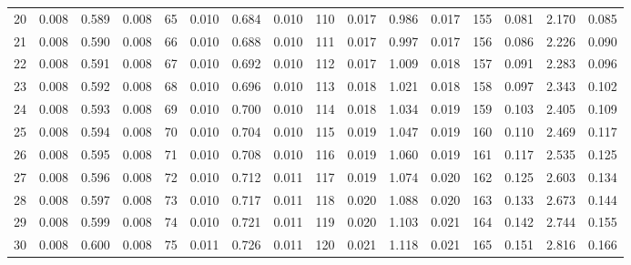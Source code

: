 \begin{table}[!h]
{\begin{tabular}{rrrr|rrrr|rrrr|crrr}
 20 & \tiny{  0.008} &   0.589 & \tiny{  0.008} &  65 & \tiny{  0.010} &   0.684 & \tiny{  0.010} & 110 & \tiny{  0.017} &   0.986 & \tiny{  0.017} & 155 & \tiny{  0.081} &   2.170 & \tiny{  0.085}\\
 21 & \tiny{  0.008} &   0.590 & \tiny{  0.008} &  66 & \tiny{  0.010} &   0.688 & \tiny{  0.010} & 111 & \tiny{  0.017} &   0.997 & \tiny{  0.017} & 156 & \tiny{  0.086} &   2.226 & \tiny{  0.090}\\
 22 & \tiny{  0.008} &   0.591 & \tiny{  0.008} &  67 & \tiny{  0.010} &   0.692 & \tiny{  0.010} & 112 & \tiny{  0.017} &   1.009 & \tiny{  0.018} & 157 & \tiny{  0.091} &   2.283 & \tiny{  0.096}\\
 23 & \tiny{  0.008} &   0.592 & \tiny{  0.008} &  68 & \tiny{  0.010} &   0.696 & \tiny{  0.010} & 113 & \tiny{  0.018} &   1.021 & \tiny{  0.018} & 158 & \tiny{  0.097} &   2.343 & \tiny{  0.102}\\
 24 & \tiny{  0.008} &   0.593 & \tiny{  0.008} &  69 & \tiny{  0.010} &   0.700 & \tiny{  0.010} & 114 & \tiny{  0.018} &   1.034 & \tiny{  0.019} & 159 & \tiny{  0.103} &   2.405 & \tiny{  0.109}\\
 25 & \tiny{  0.008} &   0.594 & \tiny{  0.008} &  70 & \tiny{  0.010} &   0.704 & \tiny{  0.010} & 115 & \tiny{  0.019} &   1.047 & \tiny{  0.019} & 160 & \tiny{  0.110} &   2.469 & \tiny{  0.117}\\
 26 & \tiny{  0.008} &   0.595 & \tiny{  0.008} &  71 & \tiny{  0.010} &   0.708 & \tiny{  0.010} & 116 & \tiny{  0.019} &   1.060 & \tiny{  0.019} & 161 & \tiny{  0.117} &   2.535 & \tiny{  0.125}\\
 27 & \tiny{  0.008} &   0.596 & \tiny{  0.008} &  72 & \tiny{  0.010} &   0.712 & \tiny{  0.011} & 117 & \tiny{  0.019} &   1.074 & \tiny{  0.020} & 162 & \tiny{  0.125} &   2.603 & \tiny{  0.134}\\
 28 & \tiny{  0.008} &   0.597 & \tiny{  0.008} &  73 & \tiny{  0.010} &   0.717 & \tiny{  0.011} & 118 & \tiny{  0.020} &   1.088 & \tiny{  0.020} & 163 & \tiny{  0.133} &   2.673 & \tiny{  0.144}\\
 29 & \tiny{  0.008} &   0.599 & \tiny{  0.008} &  74 & \tiny{  0.010} &   0.721 & \tiny{  0.011} & 119 & \tiny{  0.020} &   1.103 & \tiny{  0.021} & 164 & \tiny{  0.142} &   2.744 & \tiny{  0.155}\\
 30 & \tiny{  0.008} &   0.600 & \tiny{  0.008} &  75 & \tiny{  0.011} &   0.726 & \tiny{  0.011} & 120 & \tiny{  0.021} &   1.118 & \tiny{  0.021} & 165 & \tiny{  0.151} &   2.816 & \tiny{  0.166}\\

\end{tabular}}
\end{table}
